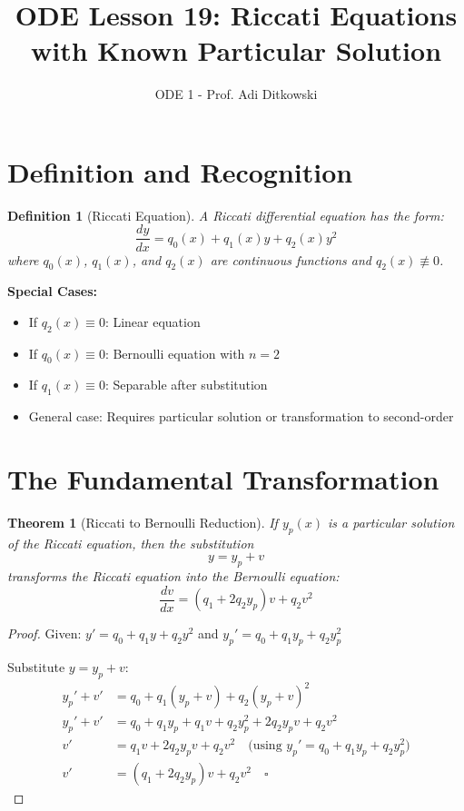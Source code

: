 \documentclass[12pt]{article}
\title{ODE Lesson 19: Riccati Equations with Known Particular Solution}
\author{ODE 1 - Prof. Adi Ditkowski}
\date{}
\newtheorem{definition}{Definition}
\newtheorem{theorem}{Theorem}
\begin{document}
\maketitle

\section{Definition and Recognition}

\begin{definition}[Riccati Equation]
A Riccati differential equation has the form:
$$\frac{dy}{dx} = q_0(x) + q_1(x)y + q_2(x)y^2$$
where $q_0(x)$, $q_1(x)$, and $q_2(x)$ are continuous functions and $q_2(x) \not\equiv 0$.
\end{definition}

\begin{keypoint}
\textbf{Special Cases:}
\begin{itemize}
    \item If $q_2(x) \equiv 0$: Linear equation
    \item If $q_0(x) \equiv 0$: Bernoulli equation with $n = 2$
    \item If $q_1(x) \equiv 0$: Separable after substitution
    \item General case: Requires particular solution or transformation to second-order
\end{itemize}
\end{keypoint}

\section{The Fundamental Transformation}

\begin{theorem}[Riccati to Bernoulli Reduction]
If $y_p(x)$ is a particular solution of the Riccati equation, then the substitution
$$y = y_p + v$$
transforms the Riccati equation into the Bernoulli equation:
$$\frac{dv}{dx} = (q_1 + 2q_2y_p)v + q_2v^2$$
\end{theorem}

\begin{proof}
Given: $y' = q_0 + q_1y + q_2y^2$ and $y_p' = q_0 + q_1y_p + q_2y_p^2$

Substitute $y = y_p + v$:
\begin{align}
y_p' + v' &= q_0 + q_1(y_p + v) + q_2(y_p + v)^2 \\
y_p' + v' &= q_0 + q_1y_p + q_1v + q_2y_p^2 + 2q_2y_pv + q_2v^2 \\
v' &= q_1v + 2q_2y_pv + q_2v^2 \quad \text{(using } y_p' = q_0 + q_1y_p + q_2y_p^2\text{)} \\
v' &= (q_1 + 2q_2y_p)v + q_2v^2 \quad \square
\end{align}
\end{proof}
\end{document}
